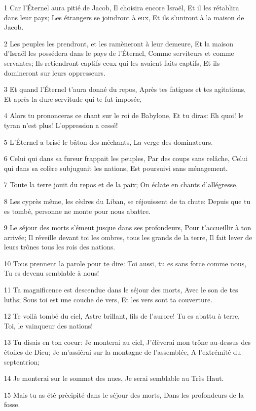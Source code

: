 \par 1 Car l'Éternel aura pitié de Jacob, Il choisira encore Israël, Et il les rétablira dans leur pays; Les étrangers se joindront à eux, Et ils s'uniront à la maison de Jacob.
\par 2 Les peuples les prendront, et les ramèneront à leur demeure, Et la maison d'Israël les possédera dans le pays de l'Éternel, Comme serviteurs et comme servantes; Ils retiendront captifs ceux qui les avaient faits captifs, Et ils domineront sur leurs oppresseurs.
\par 3 Et quand l'Éternel t'aura donné du repos, Après tes fatigues et tes agitations, Et après la dure servitude qui te fut imposée,
\par 4 Alors tu prononceras ce chant sur le roi de Babylone, Et tu diras: Eh quoi! le tyran n'est plus! L'oppression a cessé!
\par 5 L'Éternel a brisé le bâton des méchants, La verge des dominateurs.
\par 6 Celui qui dans sa fureur frappait les peuples, Par des coups sans relâche, Celui qui dans sa colère subjuguait les nations, Est poursuivi sans ménagement.
\par 7 Toute la terre jouit du repos et de la paix; On éclate en chants d'allégresse,
\par 8 Les cyprès même, les cèdres du Liban, se réjouissent de ta chute: Depuis que tu es tombé, personne ne monte pour nous abattre.
\par 9 Le séjour des morts s'émeut jusque dans ses profondeurs, Pour t'accueillir à ton arrivée; Il réveille devant toi les ombres, tous les grands de la terre, Il fait lever de leurs trônes tous les rois des nations.
\par 10 Tous prennent la parole pour te dire: Toi aussi, tu es sans force comme nous, Tu es devenu semblable à nous!
\par 11 Ta magnificence est descendue dans le séjour des morts, Avec le son de tes luths; Sous toi est une couche de vers, Et les vers sont ta couverture.
\par 12 Te voilà tombé du ciel, Astre brillant, fils de l'aurore! Tu es abattu à terre, Toi, le vainqueur des nations!
\par 13 Tu disais en ton coeur: Je monterai au ciel, J'élèverai mon trône au-dessus des étoiles de Dieu; Je m'assiérai sur la montagne de l'assemblée, A l'extrémité du septentrion;
\par 14 Je monterai sur le sommet des nues, Je serai semblable au Très Haut.
\par 15 Mais tu as été précipité dans le séjour des morts, Dans les profondeurs de la fosse.
